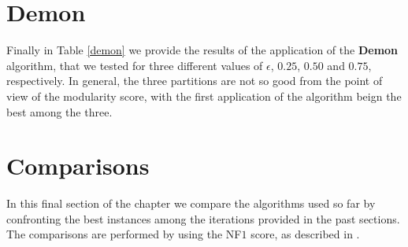 
\section{Demon} %
\label{sec:demon}
    Finally in Table \ref{demon} we provide the results of the application of the \textbf{Demon} algorithm, that
    we tested for three different values of $\epsilon$, $0.25$, $0.50$ and $0.75$, respectively. In general, the
    three partitions are not so good from the point of view of the modularity score, with the first application
    of the algorithm beign the best among the three.

    \begin{table}[H]
        \centering
        \begin{subtable}{\textwidth}
        \end{subtable}
        \caption{Evaluation of the partition obtained by the application of the Demon algorithm.}
        \label{demon}
    \end{table}


\section{Comparisons} %
\label{sec:comparisons}
    In this final section of the chapter we compare the algorithms used so far by confronting the best instances
    among the iterations provided in the past sections. The comparisons are performed by using the NF$1$ score, as
    described in \cite{rossetti2016}.

